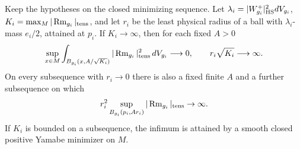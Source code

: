 \begin{corollary}\label{cor:energy-radius}
Keep the hypotheses on the closed minimizing sequence. Let
\(\lambda_i=|W^+_{g_i}|_{\rm HS}^2dV_{g_i}\),
\(K_i=\max_M|\operatorname{Rm}_{g_i}|_{\rm tens}\), and let \(r_i\) be the
least physical radius of a ball with \(\lambda_i\)-mass \(e_i/2\),
attained at \(p_i\). If \(K_i\to\infty\), then for each fixed \(A>0\)
\begin{equation}\label{eq:peak-energy}
 \sup_{x\in M}\int_{B_{g_i}(x,A/\sqrt{K_i})}
              |\operatorname{Rm}_{g_i}|_{\rm tens}^2\,dV_{g_i}\longrightarrow0,
 \qquad r_i\sqrt{K_i}\longrightarrow\infty .
\end{equation}
On every subsequence with \(r_i\to0\) there is also a fixed finite
\(A\) and a further subsequence on which
\[
 r_i^2\sup_{B_{g_i}(p_i,A r_i)}|\operatorname{Rm}_{g_i}|_{\rm tens}\to\infty .
\]
If \(K_i\) is bounded on a subsequence, the infimum is attained by
a smooth closed positive Yamabe minimizer on \(M\).
\end{corollary}


